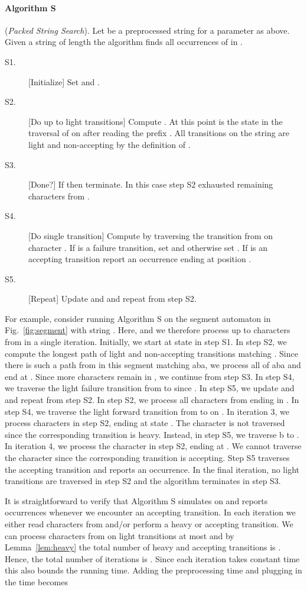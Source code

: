 \documentclass{article}
\begin{document}
\paragraph{\bf Algorithm S}(\emph{Packed String Search}). Let  be a
preprocessed string for a parameter  as above. Given a string 
of length  the algorithm finds all occurrences of  in .
\begin{description}
\item[S1.] [Initialize] Set  and .
\item[S2.] [Do up to  light transitions] Compute . At this point  is
  the state in the traversal of  on  after reading the prefix
  . All transitions on the string  are light and
  non-accepting by the definition of .
\item[S3.] [Done?] If  then terminate. In this case step S2
  exhausted remaining characters from .
\item[S4.] [Do single transition] Compute  by traversing the
  transition  from  on character . If
   is a failure transition, set  and
  otherwise set . If  is an
  accepting transition report an occurrence ending at position .
\item[S5.] [Repeat] Update  and  and repeat from step S2.
\end{description}
For example, consider running Algorithm S on the segment automaton in
Fig.~\ref{fig:segment} with string . Here,  and we therefore process up to  characters from  in a
single iteration. Initially, we start at state  in step S1. In
step S2, we compute the longest path of light and non-accepting
transitions matching . Since there is such a path
from  in this segment matching aba, we process all of aba and
end at . Since more characters remain in , we continue from
step S3. In step S4, we traverse the light failure transition from
 to  since . In step S5, we update
 and  and repeat from step
S2. In step S2, we process all characters from 
ending in . In step S4, we traverse the light forward
transition from  to  on . In iteration
3, we process characters  in step S2, ending at state
. The character  is not traversed since the
corresponding transition is heavy. Instead, in step S5, we traverse b
to . In iteration 4, we process the character  in
step S2, ending at . We cannot traverse the character  since the corresponding transition is accepting. Step S5 traverses
the accepting transition and reports an occurrence. In the final
iteration, no light transitions are traversed in step S2 and the
algorithm terminates in step S3.


It is straightforward to verify that Algorithm S simulates  on
 and reports occurrences whenever we encounter an accepting
transition. In each iteration we either read  characters from 
and/or perform a heavy or accepting transition. We can process 
characters from  on light transitions at most  and by
Lemma~\ref{lem:heavy} the total number of heavy and accepting
transitions is . Hence, the total number of iterations
is . Since each iteration takes constant time this also
bounds the running time. Adding the preprocessing time and plugging in
 the time becomes
\end{document}
